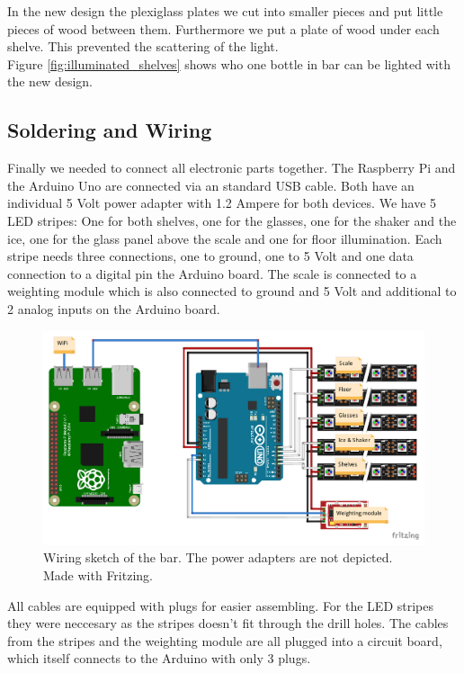 \documentclass{acm_proc_article-sp}
\begin{document}
In the new design the plexiglass plates we cut into smaller pieces and put little pieces of wood between them. Furthermore we put a plate of wood under each shelve. This prevented the scattering of the light.\\
Figure \ref{fig:illuminated_shelves} shows who one bottle in bar can be lighted with the new design.

\subsection{Soldering and Wiring}
Finally we needed to connect all electronic parts together. The Raspberry Pi and the Arduino Uno are connected via an standard USB cable. Both have an individual 5 Volt power adapter with 1.2 Ampere for both devices. We have 5 LED stripes: One for both shelves, one for the glasses, one for the shaker and the ice, one for the glass panel above the scale and one for floor illumination. Each stripe needs three connections, one to ground, one to 5 Volt and one data connection to a digital pin the Arduino board. The scale is connected to a weighting module which is also connected to ground and 5 Volt and additional to 2 analog inputs on the Arduino board.

\begin{figure}[htbp] 
  \centering
     \includegraphics[width=1\linewidth]{pictures/sketch.pdf}
  \caption{Wiring sketch of the bar. The power adapters are not depicted. Made with Fritzing.}
  \label{fig:fritzing}
\end{figure}

All cables are equipped with plugs for easier assembling. For the LED stripes they were neccesary as the stripes doesn't fit through the drill holes. The cables from the stripes and the weighting module are all plugged into a circuit board, which itself connects to the Arduino with only 3 plugs. 
\end{document}
